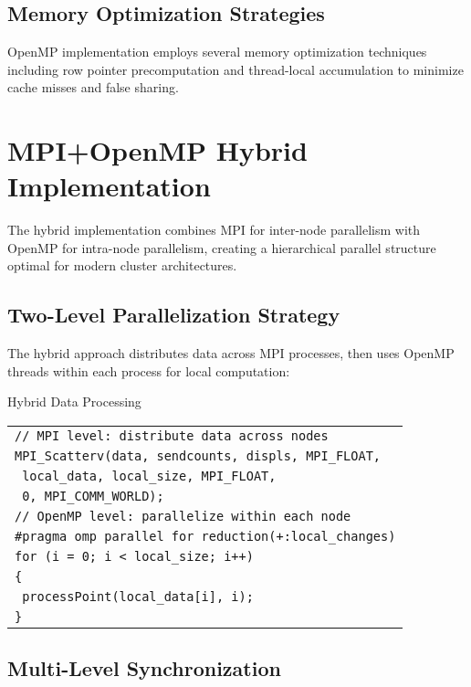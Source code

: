 \documentclass[10pt,a4paper,twocolumn]{article}
\makeatletter
\newcounter{alglineno}
\newenvironment{algtabular}{%
\setcounter{alglineno}{0}%
\begin{tabular}{@{\stepcounter{alglineno}\makebox[1.2em][r]{\tiny\thealglineno:}\hspace{0.2em}}l@{}}%
}{%
\end{tabular}%
}
\makeatother
\begin{document}
\subsection{Memory Optimization Strategies}

OpenMP implementation employs several memory optimization techniques including row pointer precomputation and thread-local accumulation to minimize cache misses and false sharing.

\section{MPI+OpenMP Hybrid Implementation}

The hybrid implementation combines MPI for inter-node parallelism with OpenMP for intra-node parallelism, creating a hierarchical parallel structure optimal for modern cluster architectures.

\subsection{Two-Level Parallelization Strategy}

The hybrid approach distributes data across MPI processes, then uses OpenMP threads within each process for local computation:

\begin{algorithm}[H]
\caption{Hybrid Data Processing}
\label{alg:hybrid_processing}
\begin{algtabular}
\texttt{// MPI level: distribute data across nodes} \\
\texttt{MPI\_Scatterv(data, sendcounts, displs, MPI\_FLOAT,} \\
\texttt{             local\_data, local\_size, MPI\_FLOAT,} \\
\texttt{             0, MPI\_COMM\_WORLD);} \\
\texttt{// OpenMP level: parallelize within each node} \\
\texttt{\#pragma omp parallel for reduction(+:local\_changes)} \\
\texttt{for (i = 0; i < local\_size; i++)} \\
\texttt{\{} \\
\texttt{  processPoint(local\_data[i], i);} \\
\texttt{\}} \\
\end{algtabular}
\end{algorithm}

\subsection{Multi-Level Synchronization}
\end{document}
